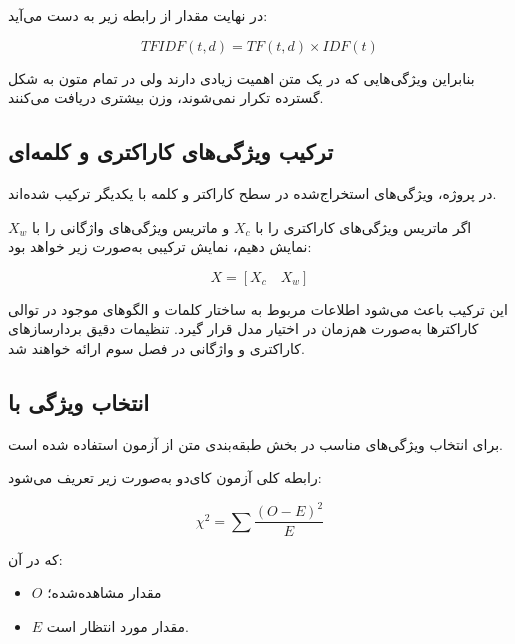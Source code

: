 در نهایت مقدار
از رابطه زیر به دست می‌آید:

\begin{equation}
TFIDF(t,d)
=
TF(t,d)
\times
IDF(t)
\end{equation}

بنابراین ویژگی‌هایی که در یک متن اهمیت زیادی دارند ولی در تمام متون به شکل گسترده تکرار نمی‌شوند، وزن بیشتری دریافت می‌کنند.


\subsection{ترکیب ویژگی‌های کاراکتری و کلمه‌ای}

در پروژه، ویژگی‌های استخراج‌شده در سطح کاراکتر و کلمه با یکدیگر ترکیب شده‌اند.

اگر ماتریس ویژگی‌های کاراکتری را با $X_c$ و ماتریس ویژگی‌های واژگانی را با $X_w$ نمایش دهیم، نمایش ترکیبی به‌صورت زیر خواهد بود:

\begin{equation}
X=
\left[
X_c
\quad
X_w
\right]
\end{equation}

این ترکیب باعث می‌شود اطلاعات مربوط به ساختار کلمات و الگوهای موجود در توالی کاراکترها به‌صورت هم‌زمان در اختیار مدل قرار گیرد. تنظیمات دقیق بردارسازهای کاراکتری و واژگانی در فصل سوم ارائه خواهند شد.


\subsection{انتخاب ویژگی با }

برای انتخاب ویژگی‌های مناسب در بخش طبقه‌بندی متن از آزمون
استفاده شده است.

رابطه کلی آزمون کای‌دو به‌صورت زیر تعریف می‌شود:

\begin{equation}
\chi^2
=
\sum
\frac{(O-E)^2}{E}
\end{equation}

که در آن:

\begin{itemize}

	\item $O$ مقدار مشاهده‌شده؛

	\item $E$ مقدار مورد انتظار است.

\end{itemize}

